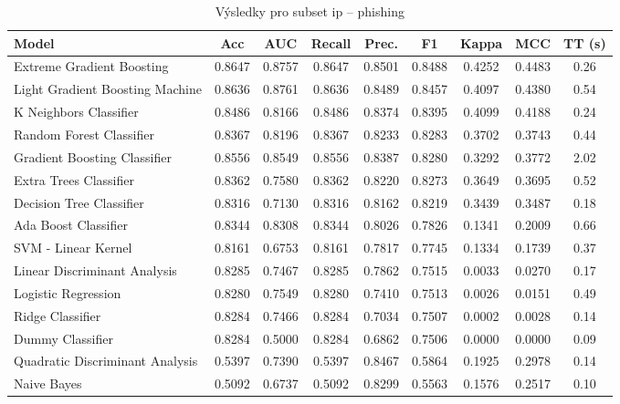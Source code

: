 \begin{table}[H]
  \centering
  \small
  \caption{Výsledky pro subset ip – phishing}
  \begin{tabular}{|l|c|c|c|c|c|c|c|c|}
    \hline
    \textbf{Model} & \textbf{Acc} & \textbf{AUC} & \textbf{Recall} & \textbf{Prec.} & \textbf{F1} & \textbf{Kappa} & \textbf{MCC} & \textbf{TT (s)} \\
    \hline
    Extreme Gradient Boosting & 0.8647 & 0.8757 & 0.8647 & 0.8501 & 0.8488 & 0.4252 & 0.4483 & 0.26 \\
    Light Gradient Boosting Machine & 0.8636 & 0.8761 & 0.8636 & 0.8489 & 0.8457 & 0.4097 & 0.4380 & 0.54 \\
    K Neighbors Classifier & 0.8486 & 0.8166 & 0.8486 & 0.8374 & 0.8395 & 0.4099 & 0.4188 & 0.24 \\
    Random Forest Classifier & 0.8367 & 0.8196 & 0.8367 & 0.8233 & 0.8283 & 0.3702 & 0.3743 & 0.44 \\
    Gradient Boosting Classifier & 0.8556 & 0.8549 & 0.8556 & 0.8387 & 0.8280 & 0.3292 & 0.3772 & 2.02 \\
    Extra Trees Classifier & 0.8362 & 0.7580 & 0.8362 & 0.8220 & 0.8273 & 0.3649 & 0.3695 & 0.52 \\
    Decision Tree Classifier & 0.8316 & 0.7130 & 0.8316 & 0.8162 & 0.8219 & 0.3439 & 0.3487 & 0.18 \\
    Ada Boost Classifier & 0.8344 & 0.8308 & 0.8344 & 0.8026 & 0.7826 & 0.1341 & 0.2009 & 0.66 \\
    SVM - Linear Kernel & 0.8161 & 0.6753 & 0.8161 & 0.7817 & 0.7745 & 0.1334 & 0.1739 & 0.37 \\
    Linear Discriminant Analysis & 0.8285 & 0.7467 & 0.8285 & 0.7862 & 0.7515 & 0.0033 & 0.0270 & 0.17 \\
    Logistic Regression & 0.8280 & 0.7549 & 0.8280 & 0.7410 & 0.7513 & 0.0026 & 0.0151 & 0.49 \\
    Ridge Classifier & 0.8284 & 0.7466 & 0.8284 & 0.7034 & 0.7507 & 0.0002 & 0.0028 & 0.14 \\
    Dummy Classifier & 0.8284 & 0.5000 & 0.8284 & 0.6862 & 0.7506 & 0.0000 & 0.0000 & 0.09 \\
    Quadratic Discriminant Analysis & 0.5397 & 0.7390 & 0.5397 & 0.8467 & 0.5864 & 0.1925 & 0.2978 & 0.14 \\
    Naive Bayes & 0.5092 & 0.6737 & 0.5092 & 0.8299 & 0.5563 & 0.1576 & 0.2517 & 0.10 \\
    \hline
  \end{tabular}
\end{table}
\vspace{0.5cm}

